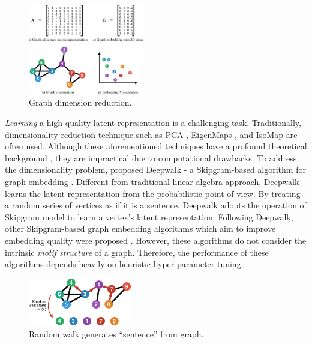 \documentclass[letterpaper]{article}
\begin{document}
        \begin{figure}
            \centering
            \includegraphics[width=0.45\textwidth]{fig1_dimrec}
            \caption{Graph dimension reduction.}
            \label{fig:dimrec}
        \end{figure}

        \emph{Learning} a high-quality latent representation is a challenging task. Traditionally,
        dimensionality reduction technique such as PCA \cite{pca}, EigenMaps \cite{eigmaps}, and IsoMap 
        \cite{isomap} are often used. Although these aforementioned techniques have a profound theoretical
        background \cite{dimrecrev}, they are impractical due to computational drawbacks. To address
        the dimensionality problem, \citeauthor{deepwalk} proposed Deepwalk - a Skipgram-based algorithm
        for graph embedding \cite{deepwalk}. Different from traditional linear algebra approach,
        Deepwalk learns the latent representation from the probabilistic point of view. By treating
        a random series of vertices as if it is a sentence, Deepwalk adopts the operation
        of Skipgram model \cite{skipgram} to learn a vertex's latent representation. Following
        Deepwalk, other Skipgram-based graph embedding algorithms which aim to improve embedding
        quality were proposed \cite{grarep,line,planetoid,node2vec}. However, these algorithms
        do not consider the intrinsic \emph{motif structure} of a graph. Therefore, the performance
        of these algorithms depends heavily on heuristic hyper-parameter tuning.

        \begin{figure}
            \centering
            \includegraphics[width=0.4\textwidth]{fig2_congen}
            \caption{Random walk generates ``sentence'' from graph.}
            \label{fig:congen}
        \end{figure}
\end{document}
